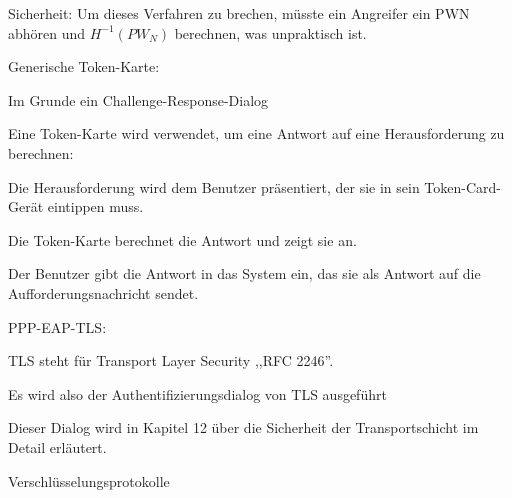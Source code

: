 \documentclass[a4paper]{article}
\begin{document}
\begin{multicols}{3}
\begin{itemize*}
\begin{itemize*}
                  \item Sicherheit: Um dieses Verfahren zu brechen, müsste ein Angreifer ein PWN abhören und $H^{-1}(PW_N)$ berechnen, was unpraktisch ist.
            \end{itemize*}
            \item Generische Token-Karte:
            \begin{itemize*}
                  \item Im Grunde ein Challenge-Response-Dialog
                  \item Eine Token-Karte wird verwendet, um eine Antwort auf eine Herausforderung zu berechnen:
                  \begin{itemize*} \item Die Herausforderung wird dem Benutzer präsentiert, der sie in sein Token-Card-Gerät eintippen muss. \item Die Token-Karte berechnet die Antwort und zeigt sie an. \item Der Benutzer gibt die Antwort in das System ein, das sie als Antwort auf die Aufforderungsnachricht sendet. \end{itemize*}
            \end{itemize*}
            \item PPP-EAP-TLS:
            \begin{itemize*}
                  \item TLS steht für Transport Layer Security ,,RFC 2246''.
                  \item Es wird also der Authentifizierungsdialog von TLS ausgeführt
                  \item Dieser Dialog wird in Kapitel 12 über die Sicherheit der Transportschicht im Detail erläutert.
            \end{itemize*}
      \end{itemize*}

      Verschlüsselungsprotokolle


\end{multicols}
\end{document}
